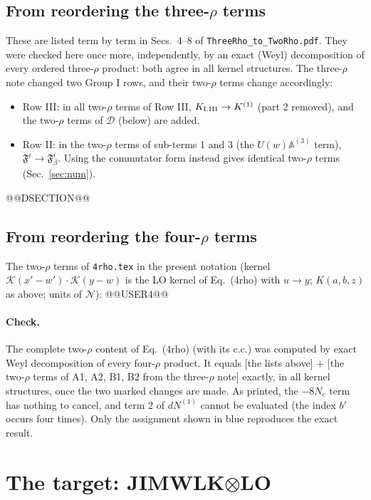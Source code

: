 \documentclass[10pt]{article}
\numberwithin{equation}{section}
\newcommand{\KK}{\mathcal K}
\newcommand{\NN}{\mathcal N}
\begin{document}
\subsection{From reordering the three-\texorpdfstring{$\rho$}{rho} terms}\label{sec:three}
These are listed term by term in Secs.~4--8 of \texttt{ThreeRho\_to\_TwoRho.pdf}. They were checked here once more, independently, by an exact (Weyl) decomposition of every ordered three-$\rho$ product: both agree in all kernel structures. The three-$\rho$ note changed two Group I rows, and their two-$\rho$ terms change accordingly:
\begin{itemize}
\item Row III: in all two-$\rho$ terms of Row III, $K_{\rm I.III}\to K^{(1)}$ (part 2 removed), and the two-$\rho$ terms of $\mathcal D$ (below) are added.
\item Row II: in the two-$\rho$ terms of sub-terms 1 and 3 (the $U(w)\mathbb A^{(3)}$ term), $\mathfrak F^i\to\mathfrak F^i_\beta$. Using the commutator form instead gives identical two-$\rho$ terms (Sec.~\ref{sec:num}).
\end{itemize}
@@DSECTION@@

\subsection{From reordering the four-\texorpdfstring{$\rho$}{rho} terms}\label{sec:four}
The two-$\rho$ terms of \texttt{4rho.tex} in the present notation (kernel $\KK(x'-w')\cdot\KK(y-w)$ is the LO kernel of Eq.~(4rho) with $u\to y$; $K(a,b,z)$ as above; units of $\NN$):
@@USER4@@
\paragraph{Check.} The complete two-$\rho$ content of Eq.~(4rho) (with its c.c.) was computed by exact Weyl decomposition of every four-$\rho$ product. It equals [the lists above] + [the two-$\rho$ terms of A1, A2, B1, B2 from the three-$\rho$ note] exactly, in all kernel structures, once the two marked changes are made. As printed, the $-8N_c$ term has nothing to cancel, and term 2 of $dN^{(1)}$ cannot be evaluated (the index $b'$ occurs four times). Only the assignment shown in blue reproduces the exact result.

\section{The target: JIMWLK\texorpdfstring{$\otimes$}{x}LO}\label{sec:target}
\end{document}
